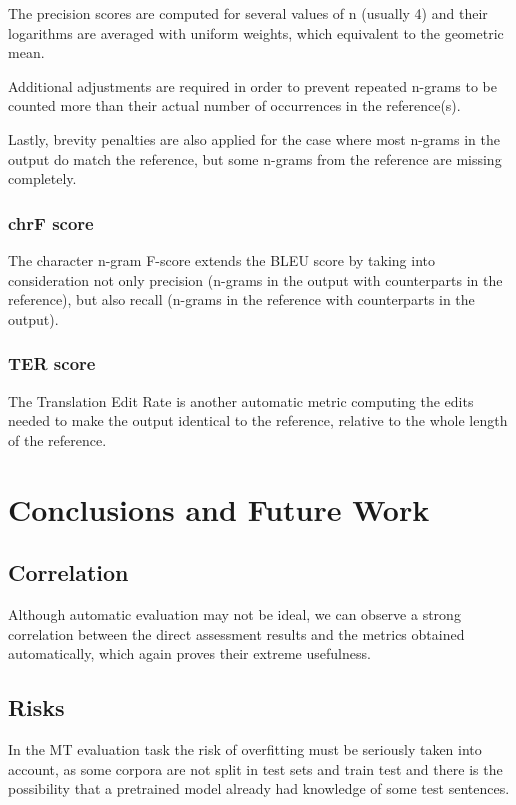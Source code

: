 \documentclass[11pt]{article}
\begin{document}
The precision scores are computed for several values of n (usually 4)
and their logarithms are averaged with uniform weights, which equivalent to the geometric mean.

Additional adjustments are required in order to prevent repeated n-grams
to be counted more than their actual number of occurrences in the reference(s).

Lastly, brevity penalties are also applied
for the case where most n-grams in the output do match the reference, but
some n-grams from the reference are missing completely.

\subsubsection{chrF score}

The character n-gram F-score \citep{popovic-2015-chrf} extends the BLEU score
by taking into consideration not only precision (n-grams in the output with counterparts in the reference),
but also recall (n-grams in the reference with counterparts in the output).

\subsubsection{TER score}
The Translation Edit Rate \citep{snover-etal-2006-study} is another automatic metric
computing the edits needed to make the output identical to the reference,
relative to the whole length of the reference.

\section{Conclusions and Future Work}
\label{section:conclusions}

\subsection{Correlation}

Although automatic evaluation may not be ideal, we can observe
a strong correlation between the direct assessment results and the
metrics obtained automatically, which again proves their extreme usefulness.

\subsection{Risks}

In the MT evaluation task the risk of overfitting must be
seriously taken into account, as some corpora are not split in test sets and train test
and there is the possibility that a pretrained model already had knowledge
of some test sentences.
\end{document}
